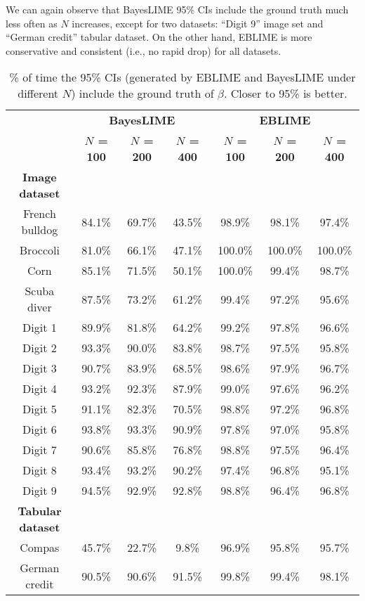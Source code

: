\documentclass{article}
\theoremstyle{plain}
\theoremstyle{definition}
\theoremstyle{remark}
\begin{document}
We can again observe that BayesLIME 95\% CIs include the ground truth much less often as $N$ increases, except for two datasets: “Digit 9” image set and “German credit” tabular dataset. On the other hand, EBLIME is more conservative and consistent (i.e., no rapid drop) for all datasets. 

\begin{table}[hbt]
\caption{\% of time the 95\% CIs (generated by EBLIME and BayesLIME under different $N$) include the ground truth of $\beta$. Closer to 95\% is better.}
\label{other_CIs}
\begin{center}
\begin{tabular}{c|ccc|ccc}
\hline
 & \multicolumn{3}{c|}{\textbf{BayesLIME}}                & \multicolumn{3}{c}{\textbf{EBLIME}}                    \\
 & \textbf{$N$ = 100} & \textbf{$N$ = 200} & \textbf{$N$ = 400} & \textbf{$N$ = 100} & \textbf{$N$ = 200} & \textbf{$N$ = 400} \\ \hline
\textbf{Image dataset}   &        &        &        &         &         &         \\
French bulldog           & 84.1\% & 69.7\% & 43.5\% & 98.9\%  & 98.1\%  & 97.4\%  \\
Broccoli                 & 81.0\% & 66.1\% & 47.1\% & 100.0\% & 100.0\% & 100.0\% \\
Corn                     & 85.1\% & 71.5\% & 50.1\% & 100.0\% & 99.4\%  & 98.7\%  \\
Scuba diver              & 87.5\% & 73.2\% & 61.2\% & 99.4\%  & 97.2\%  & 95.6\%  \\
Digit 1                  & 89.9\% & 81.8\% & 64.2\% & 99.2\%  & 97.8\%  & 96.6\%  \\
Digit 2                  & 93.3\% & 90.0\% & 83.8\% & 98.7\%  & 97.5\%  & 95.8\%  \\
Digit 3                  & 90.7\% & 83.9\% & 68.5\% & 98.6\%  & 97.9\%  & 96.7\%  \\
Digit 4                  & 93.2\% & 92.3\% & 87.9\% & 99.0\%  & 97.6\%  & 96.2\%  \\
Digit 5                  & 91.1\% & 82.3\% & 70.5\% & 98.8\%  & 97.2\%  & 96.8\%  \\
Digit 6                  & 93.8\% & 93.3\% & 90.9\% & 97.8\%  & 97.0\%  & 95.8\%  \\
Digit 7                  & 90.6\% & 85.8\% & 76.8\% & 98.8\%  & 97.5\%  & 96.4\%  \\
Digit 8                  & 93.4\% & 93.2\% & 90.2\% & 97.4\%  & 96.8\%  & 95.1\%  \\
Digit 9                  & 94.5\% & 92.9\% & 92.8\% & 98.8\%  & 96.4\%  & 96.8\%  \\
\textbf{Tabular dataset} &        &        &        &         &         &         \\
Compas                   & 45.7\% & 22.7\% & 9.8\%  & 96.9\%  & 95.8\%  & 95.7\%  \\
German credit            & 90.5\% & 90.6\% & 91.5\% & 99.8\%  & 99.4\%  & 98.1\%  \\ \hline
\end{tabular}
\end{center}
\end{table}







\end{document}
